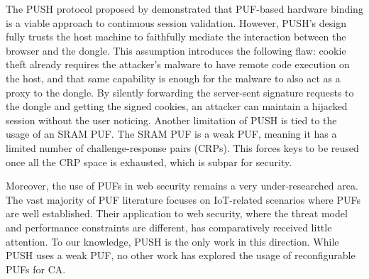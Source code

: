 
The PUSH protocol proposed by \cite{10.1007/978-3-032-07894-0_7} demonstrated that PUF-based hardware binding is a viable approach to continuous session validation. However, PUSH's design fully trusts the host machine to faithfully mediate the interaction between the browser and the dongle. This assumption introduces the following flaw: cookie theft already requires the attacker's malware to have remote code execution on the host, and that same capability is enough for the malware to also act as a proxy to the dongle. By silently forwarding the server-sent signature requests to the dongle and getting the signed cookies, an attacker can maintain a hijacked session without the user noticing. Another limitation of PUSH is tied to the usage of an SRAM PUF. The SRAM PUF is a weak PUF, meaning it has a limited number of challenge-response pairs (CRPs). This forces keys to be reused once all the CRP space is exhausted, which is subpar for security.
 
Moreover, the use of PUFs in web security remains a very under-researched area. The vast majority of PUF literature focuses on IoT-related scenarios where PUFs are well established. Their application to web security, where the threat model and performance constraints are different, has comparatively received little attention. To our knowledge, PUSH is the only work in this direction. While PUSH uses a weak PUF, no other work has explored the usage of reconfigurable PUFs for CA.

